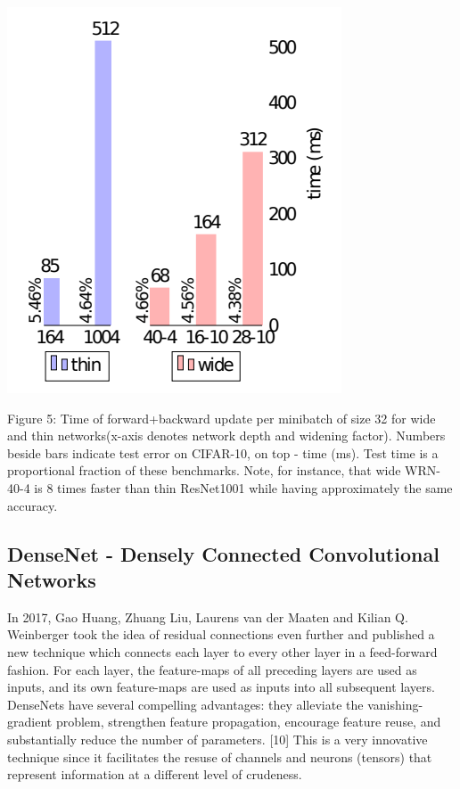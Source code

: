 \documentclass[conference]{IEEEtran}
\begin{document}
\begin{center}
    \includegraphics[scale=0.4]{WRN.PNG}\\
\end{center}
Figure 5: Time of forward+backward update per minibatch of size 32 for wide and thin networks(x-axis denotes network depth and widening factor). Numbers beside bars indicate test error on CIFAR-10, on top - time (ms). Test time is a proportional fraction of these benchmarks. Note, for instance, that wide WRN-40-4 is 8 times faster than thin ResNet1001 while having approximately the same accuracy. \cite{9}

\subsection{\textbf{DenseNet - Densely Connected Convolutional Networks}}
In 2017, Gao Huang, Zhuang Liu, Laurens van der Maaten and Kilian Q. Weinberger took the idea of residual connections even further and published a new technique which connects each layer to every other layer in a feed-forward fashion. For each layer, the feature-maps of all preceding layers are used as inputs, and its own feature-maps are used as inputs into all subsequent layers. DenseNets have several compelling advantages: they alleviate the vanishing-gradient problem, strengthen feature propagation, encourage feature reuse, and substantially reduce the number of parameters. [10] This is a very innovative technique since it facilitates the resuse of channels and neurons (tensors) that represent information at a different level of crudeness.
\end{document}
